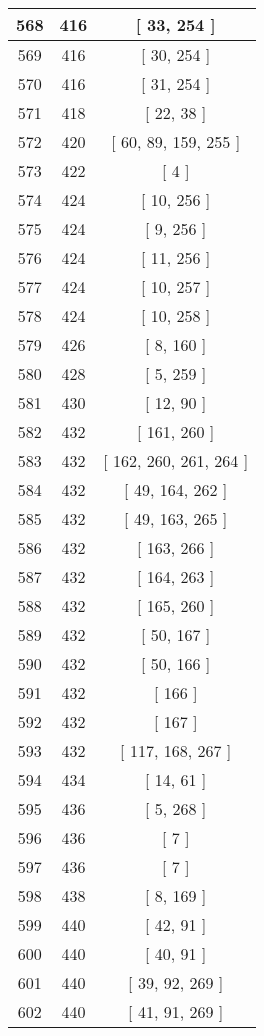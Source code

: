 \begin{center}
\begin{longtable}[H]{|| c c c ||}
\hline
568 & 416 & [ 33, 254 ] \\ 
\hline
569 & 416 & [ 30, 254 ] \\ 
\hline
570 & 416 & [ 31, 254 ] \\ 
\hline
571 & 418 & [ 22, 38 ] \\ 
\hline
572 & 420 & [ 60, 89, 159, 255 ] \\ 
\hline
573 & 422 & [ 4 ] \\ 
\hline
574 & 424 & [ 10, 256 ] \\ 
\hline
575 & 424 & [ 9, 256 ] \\ 
\hline
576 & 424 & [ 11, 256 ] \\ 
\hline
577 & 424 & [ 10, 257 ] \\ 
\hline
578 & 424 & [ 10, 258 ] \\ 
\hline
579 & 426 & [ 8, 160 ] \\ 
\hline
580 & 428 & [ 5, 259 ] \\ 
\hline
581 & 430 & [ 12, 90 ] \\ 
\hline
582 & 432 & [ 161, 260 ] \\ 
\hline
583 & 432 & [ 162, 260, 261, 264 ] \\ 
\hline
584 & 432 & [ 49, 164, 262 ] \\ 
\hline
585 & 432 & [ 49, 163, 265 ] \\ 
\hline
586 & 432 & [ 163, 266 ] \\ 
\hline
587 & 432 & [ 164, 263 ] \\ 
\hline
588 & 432 & [ 165, 260 ] \\ 
\hline
589 & 432 & [ 50, 167 ] \\ 
\hline
590 & 432 & [ 50, 166 ] \\ 
\hline
591 & 432 & [ 166 ] \\ 
\hline
592 & 432 & [ 167 ] \\ 
\hline
593 & 432 & [ 117, 168, 267 ] \\ 
\hline
594 & 434 & [ 14, 61 ] \\ 
\hline
595 & 436 & [ 5, 268 ] \\ 
\hline
596 & 436 & [ 7 ] \\ 
\hline
597 & 436 & [ 7 ] \\ 
\hline
598 & 438 & [ 8, 169 ] \\ 
\hline
599 & 440 & [ 42, 91 ] \\ 
\hline
600 & 440 & [ 40, 91 ] \\ 
\hline
601 & 440 & [ 39, 92, 269 ] \\ 
\hline
602 & 440 & [ 41, 91, 269 ] \\ 

\end{longtable}
\end{center}
